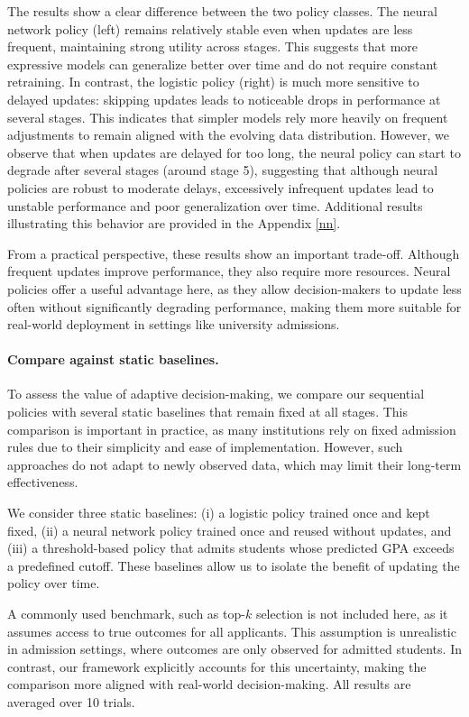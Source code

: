 \documentclass[acmlarge]{acmart-ecaf}
\begin{document}
The results show a clear difference between the two policy classes. The neural network policy (left) remains relatively stable even when updates are less frequent, maintaining strong utility across stages. This suggests that more expressive models can generalize better over time and do not require constant retraining. In contrast, the logistic policy (right) is much more sensitive to delayed updates: skipping updates leads to noticeable drops in performance at several stages. This indicates that simpler models rely more heavily on frequent adjustments to remain aligned with the evolving data distribution. However, we observe that when updates are delayed for too long, the neural policy can start to degrade after several stages (around stage 5), suggesting that although neural policies are robust to moderate delays, excessively infrequent updates lead to unstable performance and poor generalization over time. Additional results illustrating this behavior are provided in the Appendix \ref{nn}.

From a practical perspective, these results show an important trade-off. Although frequent updates improve performance, they also require more resources. Neural policies offer a useful advantage here, as they allow decision-makers to update less often without significantly degrading performance, making them more suitable for real-world deployment in settings like university admissions.


  \paragraph{Compare against static baselines.} 
To assess the value of adaptive decision-making, we compare our sequential policies with several static baselines that remain fixed at all stages. This comparison is important in practice, as many institutions rely on fixed admission rules due to their simplicity and ease of implementation. However, such approaches do not adapt to newly observed data, which may limit their long-term effectiveness.

We consider three static baselines: (i) a logistic policy trained once and kept fixed, (ii) a neural network policy trained once and reused without updates, and (iii) a threshold-based policy that admits students whose predicted GPA exceeds a predefined cutoff. These baselines allow us to isolate the benefit of updating the policy over time.

A commonly used benchmark, such as top-$k$ selection is not included here, as it assumes access to true outcomes for all applicants. This assumption is unrealistic in admission settings, where outcomes are only observed for admitted students. In contrast, our framework explicitly accounts for this uncertainty, making the comparison more aligned with real-world decision-making. All results are averaged over 10 trials.
\end{document}
